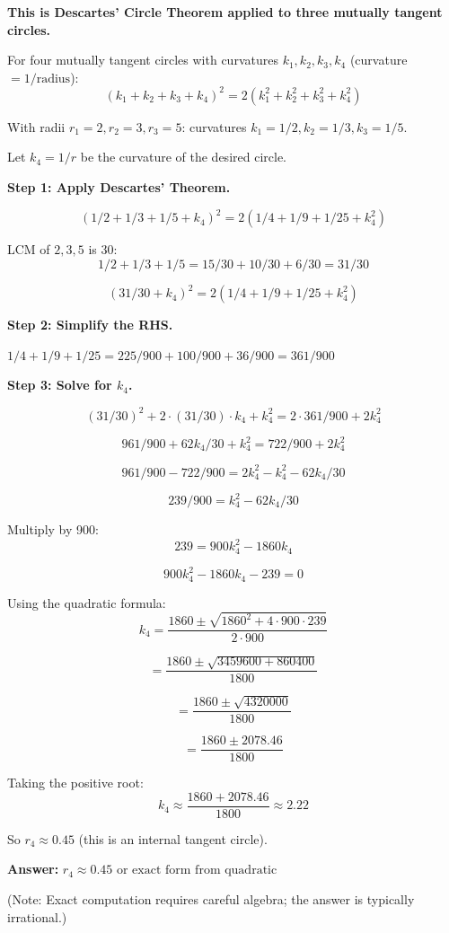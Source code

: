 ﻿\documentclass[12pt]{extarticle}
\begin{document}
\begin{solutionbox}
\textbf{This is Descartes' Circle Theorem applied to three mutually tangent circles.}

For four mutually tangent circles with curvatures $k_1, k_2, k_3, k_4$ (curvature $= 1/\text{radius}$):
\[(k_1 + k_2 + k_3 + k_4)^2 = 2(k_1^2 + k_2^2 + k_3^2 + k_4^2)\]

With radii $r_1 = 2, r_2 = 3, r_3 = 5$: curvatures $k_1 = 1/2, k_2 = 1/3, k_3 = 1/5$.

Let $k_4 = 1/r$ be the curvature of the desired circle.

\textbf{Step 1: Apply Descartes' Theorem.}

\[(1/2 + 1/3 + 1/5 + k_4)^2 = 2(1/4 + 1/9 + 1/25 + k_4^2)\]

LCM of $2, 3, 5$ is 30:
\[1/2 + 1/3 + 1/5 = 15/30 + 10/30 + 6/30 = 31/30\]

\[(31/30 + k_4)^2 = 2(1/4 + 1/9 + 1/25 + k_4^2)\]

\textbf{Step 2: Simplify the RHS.}

$1/4 + 1/9 + 1/25 = 225/900 + 100/900 + 36/900 = 361/900$

\textbf{Step 3: Solve for $k_4$.}

\[(31/30)^2 + 2 \cdot (31/30) \cdot k_4 + k_4^2 = 2 \cdot 361/900 + 2k_4^2\]

\[961/900 + 62k_4/30 + k_4^2 = 722/900 + 2k_4^2\]

\[961/900 - 722/900 = 2k_4^2 - k_4^2 - 62k_4/30\]

\[239/900 = k_4^2 - 62k_4/30\]

Multiply by 900:
\[239 = 900k_4^2 - 1860k_4\]

\[900k_4^2 - 1860k_4 - 239 = 0\]

Using the quadratic formula:
\[k_4 = \frac{1860 \pm \sqrt{1860^2 + 4 \cdot 900 \cdot 239}}{2 \cdot 900}\]

\[= \frac{1860 \pm \sqrt{3459600 + 860400}}{1800}\]

\[= \frac{1860 \pm \sqrt{4320000}}{1800}\]

\[= \frac{1860 \pm 2078.46}{1800}\]

Taking the positive root:
\[k_4 \approx \frac{1860 + 2078.46}{1800} \approx 2.22\]

So $r_4 \approx 0.45$ (this is an internal tangent circle).

\textbf{Answer:} $\boxed{r_4 \approx 0.45 \text{ or exact form from quadratic}}$

(Note: Exact computation requires careful algebra; the answer is typically irrational.)
\end{solutionbox}
\end{document}
